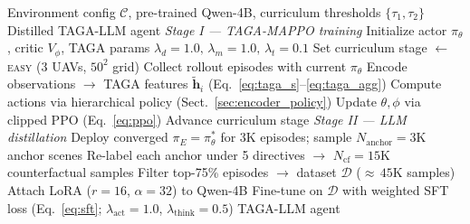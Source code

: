 \begin{algorithm}[t]
\caption{Two-stage TAGA-LLM training and distillation procedure.}
\label{alg:taga_llm}
\small
\begin{algorithmic}[1]
\REQUIRE Environment config $\mathcal{C}$, pre-trained Qwen-4B, curriculum thresholds $\{\tau_1, \tau_2\}$
\ENSURE Distilled TAGA-LLM agent
\STATE \textit{Stage I --- TAGA-MAPPO training}
\STATE Initialize actor $\pi_\theta$, critic $V_\phi$, TAGA params $\lambda_d\!=\!1.0,\, \lambda_m\!=\!1.0,\, \lambda_t\!=\!0.1$
\STATE Set curriculum stage $\gets$ \textsc{easy} (3 UAVs, $50^2$ grid)
  \STATE Collect rollout episodes with current $\pi_\theta$
  \STATE Encode observations $\to$ TAGA features $\tilde{\mathbf{h}}_i$ (Eq.~\ref{eq:taga_s}--\ref{eq:taga_agg})
  \STATE Compute actions via hierarchical policy (Sect.~\ref{sec:encoder_policy})
  \STATE Update $\theta, \phi$ via clipped PPO (Eq.~\ref{eq:ppo})
    \STATE Advance curriculum stage
  \ENDIF
\ENDFOR
\STATE \textit{Stage II --- LLM distillation}
\STATE Deploy converged $\pi_E \!=\! \pi_\theta^*$ for 3K episodes; sample $N_{\text{anchor}}\!=\!3$K anchor scenes
\STATE Re-label each anchor under 5 directives $\to$ $N_{\text{cf}}\!=\!15$K counterfactual samples
\STATE Filter top-75\% episodes $\to$ dataset $\mathcal{D}$ (${\approx}\,45$K samples)
\STATE Attach LoRA ($r\!=\!16$, $\alpha\!=\!32$) to Qwen-4B
\STATE Fine-tune on $\mathcal{D}$ with weighted SFT loss (Eq.~\ref{eq:sft}; $\lambda_{\text{act}}\!=\!1.0$, $\lambda_{\text{think}}\!=\!0.5$)
\RETURN TAGA-LLM agent
\end{algorithmic}
\end{algorithm}
